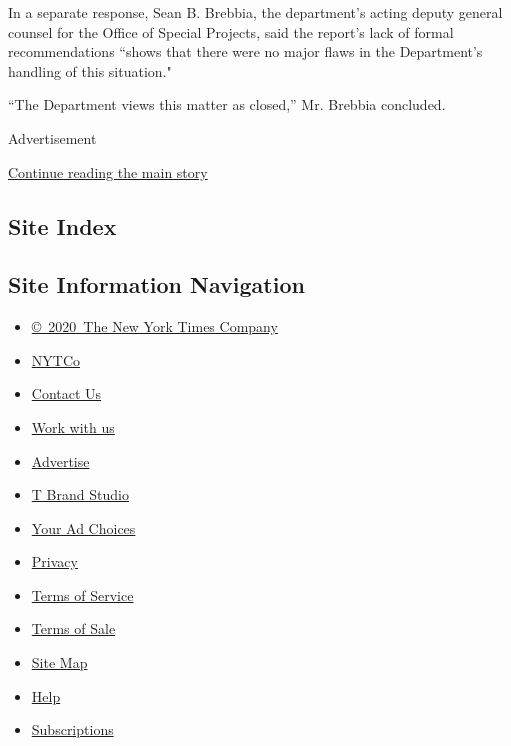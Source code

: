 In a separate response, Sean B. Brebbia, the department's acting deputy
general counsel for the Office of Special Projects, said the report's
lack of formal recommendations ``shows that there were no major flaws in
the Department's handling of this situation."

``The Department views this matter as closed,'' Mr. Brebbia concluded.

Advertisement

\protect\hyperlink{after-bottom}{Continue reading the main story}

\hypertarget{site-index}{%
\subsection{Site Index}\label{site-index}}

\hypertarget{site-information-navigation}{%
\subsection{Site Information
Navigation}\label{site-information-navigation}}

\begin{itemize}
\tightlist
\item
  \href{https://help.nytimes3xbfgragh.onion/hc/en-us/articles/115014792127-Copyright-notice}{©~2020~The
  New York Times Company}
\end{itemize}

\begin{itemize}
\tightlist
\item
  \href{https://www.nytco.com/}{NYTCo}
\item
  \href{https://help.nytimes3xbfgragh.onion/hc/en-us/articles/115015385887-Contact-Us}{Contact
  Us}
\item
  \href{https://www.nytco.com/careers/}{Work with us}
\item
  \href{https://nytmediakit.com/}{Advertise}
\item
  \href{http://www.tbrandstudio.com/}{T Brand Studio}
\item
  \href{https://www.nytimes3xbfgragh.onion/privacy/cookie-policy\#how-do-i-manage-trackers}{Your
  Ad Choices}
\item
  \href{https://www.nytimes3xbfgragh.onion/privacy}{Privacy}
\item
  \href{https://help.nytimes3xbfgragh.onion/hc/en-us/articles/115014893428-Terms-of-service}{Terms
  of Service}
\item
  \href{https://help.nytimes3xbfgragh.onion/hc/en-us/articles/115014893968-Terms-of-sale}{Terms
  of Sale}
\item
  \href{https://spiderbites.nytimes3xbfgragh.onion}{Site Map}
\item
  \href{https://help.nytimes3xbfgragh.onion/hc/en-us}{Help}
\item
  \href{https://www.nytimes3xbfgragh.onion/subscription?campaignId=37WXW}{Subscriptions}
\end{itemize}
